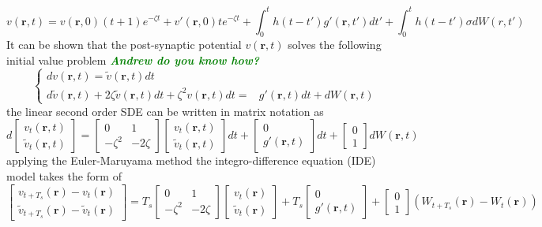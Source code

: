 \documentclass[a4paper,10pt]{article}
\newcommand{\parham}[1]{\textsf{\emph{\textbf{\textcolor{green}{#1}}}}}
\begin{document}
\begin{equation}\label{eq:SecondOrderNeuralModelDeterStoch}
v\left( {\mathbf{r},t} \right)=v(\mathbf r, 0)(t+1)e^{-\zeta t}+v'(\mathbf r,0)te^{-\zeta t}+\int_0^t {h\left( {t - t'} \right)g'\left( {\mathbf{r},t'} \right)dt'}+ \int_0^t h\left( {t - t'} \right)\sigma d W(r,t')
\end{equation}
It can be shown that the post-synaptic potential $v(\mathbf r, t)$ solves the following initial value problem \parham{Andrew do you know how?}
\begin{equation*}\label{eq:SecondOrderInitialValueProblem}
\left\lbrace \begin{array}{lc}
dv(\mathbf r,t)=\tilde{v}(\mathbf r,t)dt & \\
d\tilde{v}(\mathbf r,t)+2\zeta\tilde{v}(\mathbf r,t)dt+\zeta^2v(\mathbf r,t)dt=&g'(\mathbf r,t)dt+dW(\mathbf r,t)
\end{array}\right.
\end{equation*}
the linear second order SDE can be written in matrix notation as
\begin{equation}\label{eq:SecondOrderSDEMatrix}
 d\begin{bmatrix} v_t(\mathbf r ,t) \\ \tilde{v}_t(\mathbf r ,t)\end{bmatrix}=\begin{bmatrix}0 & 1 \\ -\zeta^2 & -2\zeta \end{bmatrix}\begin{bmatrix} v_t(\mathbf r ,t) \\ \tilde{v}_t(\mathbf r ,t)\end{bmatrix}dt+\begin{bmatrix}0 \\ g'(\mathbf r, t)\end{bmatrix}dt+\begin{bmatrix}0 \\ 1 \end{bmatrix}dW(\mathbf r,t)
\end{equation}
applying the Euler-Maruyama method the integro-difference equation (IDE) model takes the form of
\begin{equation}\label{eq:SecondOrderEulerMaruyamaDis}
 \begin{bmatrix} v_{t+T_s}(\mathbf r)-v_t(\mathbf r) \\ \tilde{v}_{t+T_s}(\mathbf r)-\tilde{v}_t(\mathbf r)\end{bmatrix}=T_s\begin{bmatrix}0 & 1 \\ -\zeta^2 & -2\zeta \end{bmatrix}\begin{bmatrix} v_t(\mathbf r)\\ \tilde{v}_t(\mathbf r)\end{bmatrix}+T_s\begin{bmatrix}0 \\ g'(\mathbf r, t)\end{bmatrix}+\begin{bmatrix}0 \\ 1 \end{bmatrix}(W_{t+T_s}(\mathbf r)-W_t(\mathbf r))
\end{equation}
\end{document}
